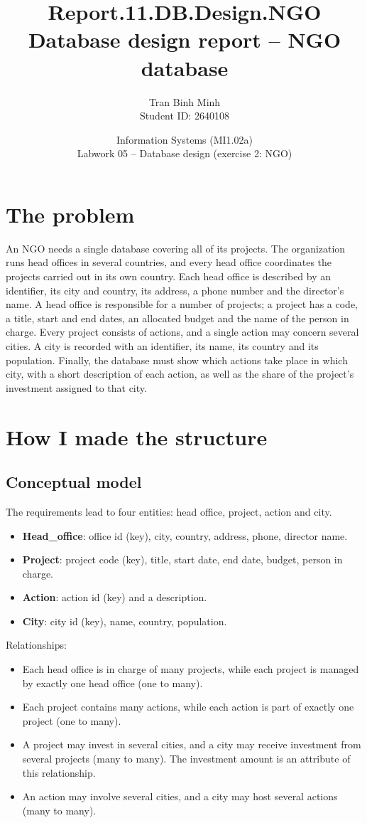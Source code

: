 \documentclass[11pt,a4paper]{article}
\title{\textbf{Report.11.DB.Design.NGO}\\[0.3em]\large Database design report -- NGO database}
\author{Tran Binh Minh \\ Student ID: 2640108}
\date{Information Systems (MI1.02a) \\ Labwork 05 -- Database design (exercise 2: NGO)}
\begin{document}
\maketitle

\section{The problem}
An NGO needs a single database covering all of its projects. The organization runs head offices in several countries, and every head office coordinates the projects carried out in its own country. Each head office is described by an identifier, its city and country, its address, a phone number and the director's name. A head office is responsible for a number of projects; a project has a code, a title, start and end dates, an allocated budget and the name of the person in charge. Every project consists of actions, and a single action may concern several cities. A city is recorded with an identifier, its name, its country and its population. Finally, the database must show which actions take place in which city, with a short description of each action, as well as the share of the project's investment assigned to that city.

\section{How I made the structure}

\subsection{Conceptual model}
The requirements lead to four entities: head office, project, action and city.
\begin{itemize}
    \item \textbf{Head\_office}: office id (key), city, country, address, phone, director name.
    \item \textbf{Project}: project code (key), title, start date, end date, budget, person in charge.
    \item \textbf{Action}: action id (key) and a description.
    \item \textbf{City}: city id (key), name, country, population.
\end{itemize}

Relationships:
\begin{itemize}
    \item Each head office is in charge of many projects, while each project is managed by exactly one head office (one to many).
    \item Each project contains many actions, while each action is part of exactly one project (one to many).
    \item A project may invest in several cities, and a city may receive investment from several projects (many to many). The investment amount is an attribute of this relationship.
    \item An action may involve several cities, and a city may host several actions (many to many).
\end{itemize}
\end{document}
